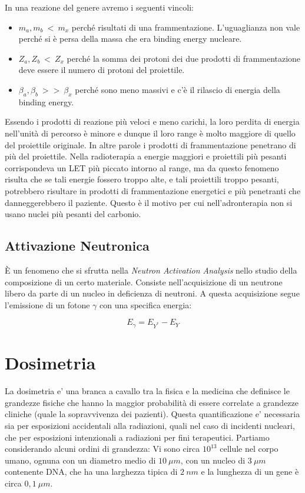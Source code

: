 \documentclass [a4paper, twoside] {book}
\begin{document}
In una reazione del genere avremo i seguenti vincoli:

\begin{itemize}
\item $m_a, m_b  \ < \ m_x$ perché risultati di una frammentazione. L'uguaglianza non vale perché si è persa della massa che era binding energy nucleare.
\item $Z_a, Z_b \ < \ Z_x$ perché la somma dei protoni dei due prodotti di frammentazione deve essere il numero di protoni del proiettile.
\item $\beta_a, \beta_b \ >> \ \beta_x$ perché sono meno massivi e c'è il rilascio di energia della binding energy.
\end{itemize}

Essendo i prodotti di reazione più veloci e meno carichi, la loro perdita di energia nell'unità di percorso è minore e dunque il loro range è molto maggiore di quello del proiettile originale. 
In altre parole i prodotti di frammentazione penetrano di più del proiettile.
Nella radioterapia a energie maggiori e proiettili più pesanti corrispondeva un LET più piccato intorno al range, ma da questo fenomeno risulta che se tali energie fossero troppo alte, e tali proiettili troppo pesanti, potrebbero risultare in prodotti di frammentazione energetici e più penetranti che danneggerebbero il paziente. Questo è il motivo per cui nell'adronterapia non si usano nuclei più pesanti del carbonio.

\section{Attivazione Neutronica}
\`E un fenomeno che si sfrutta nella \emph{Neutron Activation Analysis} nello studio della composizione di un certo materiale. Consiste nell'acquisizione di un neutrone libero da parte di un nucleo in deficienza di neutroni. A questa acquisizione segue l'emissione di un fotone $\gamma$ con una specifica energia:

\begin{equation}
E_{\gamma}=E_{Y^*}-E_{Y}
\end{equation}

\chapter{Dosimetria}
La dosimetria e' una branca a cavallo tra la fisica e la medicina che definisce le grandezze fisiche che hanno la maggior probabilità di essere correlate a grandezze cliniche (quale la sopravvivenza dei pazienti). Questa quantificazione e' necessaria sia per esposizioni accidentali alla radiazioni, quali nel caso di incidenti nucleari, che per esposizioni intenzionali a radiazioni per fini terapeutici. Partiamo considerando alcuni ordini di grandezza:
Vi sono circa $10^{13}$ cellule nel corpo umano, ognuna con un diametro medio di $10 \ \mu m$, con un nucleo di $3 \ \mu m$ contenente DNA, che ha una larghezza tipica di $ 2 \ nm$ e la lunghezza di un gene è circa $0,1 \ \mu m$.  \\
\end{document}
